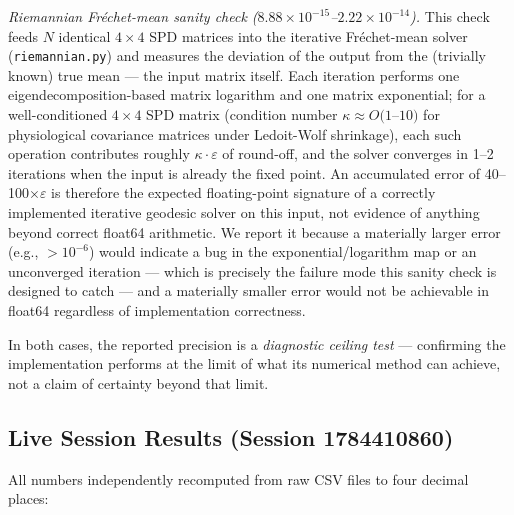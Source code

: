 \documentclass[11pt]{article}
\newcommand{\code}[1]{\texttt{#1}}
\begin{document}
\emph{Riemannian Fr\'echet-mean sanity check ($8.88 \times 10^{-15}$--$2.22 \times 10^{-14}$).} This check feeds $N$ identical $4\times4$ SPD matrices into the iterative Fr\'echet-mean solver (\code{riemannian.py}) and measures the deviation of the output from the (trivially known) true mean --- the input matrix itself. Each iteration performs one eigendecomposition-based matrix logarithm and one matrix exponential; for a well-conditioned $4\times4$ SPD matrix (condition number $\kappa \approx O(1$--$10)$ for physiological covariance matrices under Ledoit-Wolf shrinkage), each such operation contributes roughly $\kappa \cdot \varepsilon$ of round-off, and the solver converges in 1--2 iterations when the input is already the fixed point. An accumulated error of 40--100$\times \varepsilon$ is therefore the expected floating-point signature of a correctly implemented iterative geodesic solver on this input, not evidence of anything beyond correct float64 arithmetic. We report it because a materially larger error (e.g., $> 10^{-6}$) would indicate a bug in the exponential/logarithm map or an unconverged iteration --- which is precisely the failure mode this sanity check is designed to catch --- and a materially smaller error would not be achievable in float64 regardless of implementation correctness.

In both cases, the reported precision is a \emph{diagnostic ceiling test} --- confirming the implementation performs at the limit of what its numerical method can achieve, not a claim of certainty beyond that limit.

\subsection{Live Session Results (Session 1784410860)}

All numbers independently recomputed from raw CSV files to four decimal places:
\end{document}
